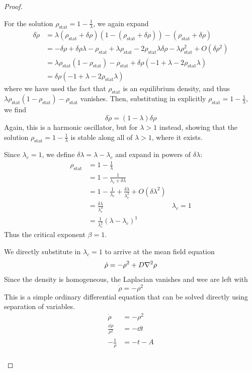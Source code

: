 \begin{proof}
\begin{parts}
		For the solution $\rho_\text{stat} = 1 - \frac 1\lambda$, we again expand
		\begin{align*}
			\delta\dot{\rho} &= \lambda\left(\rho_\text{stat}+\delta\rho\right)(1-(\rho_\text{stat}+\delta\rho))-(\rho_\text{stat}+\delta\rho)\\
			&= -\delta\rho + \delta\rho\lambda -\rho_\text{stat}+\lambda\rho_\text{stat} -2\rho_\text{stat}\lambda\delta\rho-\lambda\rho_\text{stat}^2+O(\delta\rho^2)\\
			&= \lambda\rho_\text{stat}(1-\rho_\text{stat})-\rho_\text{stat} + \delta\rho(-1+\lambda-2\rho_\text{stat}\lambda)\\
			&= \delta\rho(-1+\lambda-2\rho_\text{stat}\lambda)
		\end{align*}
		where we have used the fact that $\rho_\text{stat}$ is an equilibrium density, and thus $\lambda\rho_\text{stat}(1-\rho_\text{stat})-\rho_\text{stat}$ vanishes. Then, substituting in explicitly $\rho_\text{stat} = 1 - \frac 1\lambda$, we find
		\[\delta\dot{\rho} = (1-\lambda)\delta\rho\]
		Again, this is a harmonic oscillator, but for $\lambda>1$ instead, showing that the solution $\rho_\text{stat}=1-\frac1\lambda$ is stable along all of $\lambda>1$, where it exists.
		\item Since $\lambda_c=1$, we define $\delta\lambda=\lambda-\lambda_c$ and expand in powers of $\delta\lambda$:
		\begin{align*}
			\rho_\text{stat} &= 1-\frac 1\lambda\\
			&= 1 - \frac{1}{\lambda_c + \delta\lambda}\\
			&= 1 - \frac 1{\lambda_c} + \frac{\delta\lambda}{\lambda_c^2}+O(\delta\lambda^2)\\
			&= \frac{\delta\lambda}{\lambda_c^2} & \lambda_c = 1\\
			&= \frac 1{\lambda_c^2} (\lambda-\lambda_c)^1
		\end{align*}
		Thus the critical exponent $\beta=1$.
		\item We directly substitute in $\lambda_c = 1$ to arrive at the mean field equation
		\[\dot{\rho} = -\rho^2 + D\laplacian{\rho}\]
		Since the density is homogeneous, the Laplacian vanishes and wee are left with
		\[\dot{\rho}=-\rho^2\]
		This is a simple ordinary differential equation that can be solved directly using separation of variables.
		\begin{align*}
			\dot{\rho} &= -\rho^2 \\
			\frac{\dd{\rho}}{\rho^2}&=-\dd{t}\\
			-\frac1\rho &= -t - A\\

\end{align*}
\end{parts}
\end{proof}

